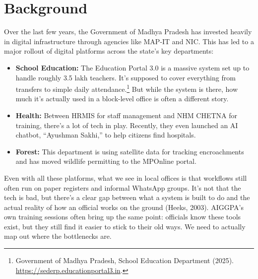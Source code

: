 \documentclass[11pt,a4paper]{article}
\begin{document}
\newpage

\section{Background}

\vspace{0.2cm}
Over the last few years, the Government of Madhya Pradesh has invested heavily in digital 
infrastructure through agencies like MAP-IT and NIC. This has led to a major rollout 
of digital platforms across the state’s key departments:

\begin{itemize}[leftmargin=1.4em]
  \item \textbf{School Education:} The Education Portal 3.0 is a massive system set up to 
    handle roughly 3.5 lakh teachers. It's supposed to cover everything 
    from transfers to simple daily attendance.\footnote{Government
    of Madhya Pradesh, School Education Department (2025). \url{https://sederp.educationportal3.in}.}
    But while the system is there, how much it's actually used in a block-level office is 
    often a different story.

  \item \textbf{Health:} Between HRMIS for staff management and NHM CHETNA for 
    training, there's a lot of tech in play. Recently, they even launched an AI chatbot, 
    ``Ayushman Sakhi,'' to help citizens find hospitals.

  \item \textbf{Forest:} This department is using satellite data for tracking 
    encroachments and has moved wildlife permitting to the MPOnline portal.
\end{itemize}

Even with all these platforms, what we see in local offices is that workflows 
still often run on paper registers and informal WhatsApp groups. It's not that 
the tech is bad, but there's a clear gap between what a system is built to do 
and the actual reality of how an official works on the ground (Heeks, 2003). 
AIGGPA's own training sessions often bring up the same point: officials know these 
tools exist, but they still find it easier to stick to their old ways. We need to 
actually map out where the bottlenecks are.

\end{document}
